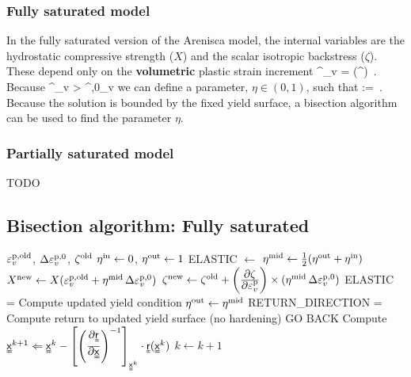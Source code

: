 \subsubsection{Fully saturated model}
In the fully saturated version of the Arenisca model, the internal variables are the hydrostatic
compressive strength ($X$) and the scalar isotropic backstress ($\zeta$).  These depend only on the
{\bf volumetric} plastic strain increment 
\Beq
  \Delta\Veps^\Tp_v = \Tr(\Delta\Bveps^\Tp) \,.
\Eeq
Because
\Beq
  \Delta\Bveps^\Tp_v > \Delta\Bveps^{\Tp,0}_v   
\Eeq
we can define a parameter, $\eta \in (0, 1)$, such that
\Beq
  \eta :=  \,.
\Eeq
Because the solution is bounded by the fixed yield surface, a bisection algorithm can be used
to find the parameter $\eta$.

\subsubsection{Partially saturated model}
{\Red TODO}

\subsection{Bisection algorithm: Fully saturated}
\begin{algorithm}
  \begin{algorithmic}[1]
    \REQUIRE $\varepsilon^{\text{p},\text{old}}_v$, $\Delta\varepsilon^{\text{p},0}_v$, $\zeta^{\text{old}}$
    \STATE $\eta^{\text{in}} \leftarrow 0$,  $\eta^{\text{out}} \leftarrow 1$ 
    \STATE ELASTIC $\leftarrow$ \TRUE
    \REPEAT
    \STATE $\eta^{\text{mid}} \leftarrow \tfrac{1}{2}(\eta^{\text{out}} + \eta^{\text{in}})$
    \STATE $X^{\text{new}} \leftarrow X(\varepsilon^{\text{p},\text{old}}_v + \eta^{\text{mid}} \,\Delta\varepsilon^{\text{p},0}_v)$
    \STATE $\zeta^{\text{new}} \leftarrow \zeta^{\text{old}} + 
        \left(\frac{\displaystyle\partial \zeta}{\displaystyle\partial \varepsilon^{\text{p}}_v}\right)\times(\eta^{\text{mid}} \,\Delta\varepsilon^{\text{p},0}_v)$
    \STATE ELASTIC = Compute updated yield condition
    \STATE $\eta^{\text{out}} \leftarrow \eta^{\text{mid}}$ 
    \ENDIF
    \STATE RETURN\_DIRECTION = Compute return to updated yield surface (no hardening)
    \STATE GO BACK 
    \ENDIF
    \STATE Compute 
      \STATE $\Mx^{k+1} \Leftarrow \Mx^k - \left[\left(\Partial{\Mr}{\Mx}\right)^{-1}\right]_{\Mx^k}\cdot
              \Mr(\Mx^k)$
      \STATE $k \leftarrow k+1$
    \ENDWHILE
  \end{algorithmic}
\end{algorithm}


